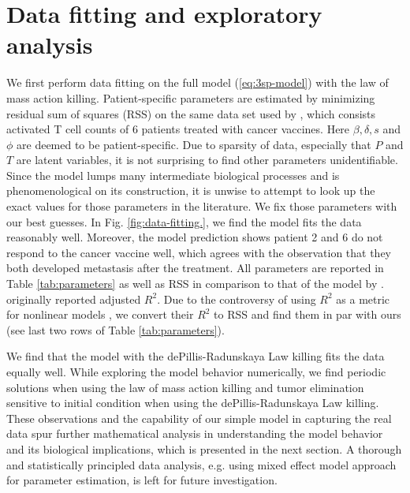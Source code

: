 \documentclass[review,authoryear]{elsarticle}
\begin{document}
\section{Data fitting and exploratory analysis} \label{sec:data}
We first perform data fitting on the full model (\ref{eq:3sp-model}) with the law of mass action killing. Patient-specific parameters are estimated by minimizing residual sum of squares (RSS) on the same data set used by \cite{Messan2021}, which consists activated T cell counts of 6 patients treated with cancer vaccines. Here $\beta, \delta, s$ and $\phi$ are deemed to be patient-specific. Due to sparsity of data, especially that $P$ and $T$ are latent variables, it is not surprising to find other parameters unidentifiable.  Since the model lumps many intermediate biological processes and is phenomenological on its construction, it is unwise to attempt to look up the exact values for those parameters in the literature. We fix those parameters with our best guesses. In Fig. \ref{fig:data-fitting.}, we find the model fits the data reasonably well. Moreover, the model prediction shows patient 2 and 6 do not respond to the cancer vaccine well, which agrees with the observation that they both developed metastasis after the treatment. All parameters are reported in Table \ref{tab:parameters} as well as RSS in comparison to that of the model by \cite{Messan2021}. \cite{Messan2021} originally reported adjusted $R^2$. Due to the controversy of using $R^2$ as a metric for nonlinear models \citep{Spiess2010}, we convert their $R^2$ to RSS and find them  in par with ours (see last two rows of Table \ref{tab:parameters}). 

We find that the model with the dePillis-Radunskaya Law killing fits the data equally well. While exploring the model behavior numerically, we find periodic solutions when using the law of mass action killing and tumor elimination sensitive to initial condition when using the dePillis-Radunskaya Law killing. These observations and the capability of our simple model in capturing the real data spur further mathematical analysis in understanding the model behavior and its biological implications, which is presented in the next section. A thorough and statistically principled data analysis, e.g. using mixed effect model approach for parameter estimation, is left for future investigation. 
\end{document}
